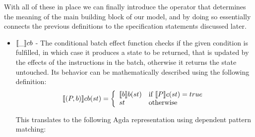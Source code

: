 With all of these in place we can finally introduce the operator that determines the meaning of the main building block of our model, and by doing so essentially connects the previous definitions to the specification statements discussed later.
\begin{itemize}
    \item $\llbracket \_ \rrbracket cb$ - The conditional batch effect function checks if the given condition is fulfilled, in which case it produces a state to be returned, that is updated by the effects of the instructions in the batch, otherwise it returns the state untouched. Its behavior can be mathematically described using the following definition:
    \begin{equation}
        \llbracket (P, b) \rrbracket cb(st) = 
        \left\{
        	\begin{array}{ll}
        		\llbracket b \rrbracket b(st) & \mbox{if } \llbracket P \rrbracket c(st) = true \\
        		st & \mbox{otherwise}
        	\end{array}
        \right.
    \end{equation}
    
    This translates to the following Agda representation using dependent pattern matching:
    \begin{code}
        \>[2]\AgdaSpace{}%
        \AgdaSymbol{:}\AgdaSpace{}%
        \AgdaSpace{}%
        \AgdaSpace{}%
        \AgdaSpace{}%
        \AgdaSpace{}%
        \<%
        \\
        \>[2]\AgdaSpace{}%
        \AgdaSymbol{(}\AgdaSpace{}%
        \AgdaOperator{\AgdaInductiveConstructor{,}}\AgdaSpace{}%
        \AgdaSymbol{)}\AgdaSpace{}%
        \AgdaSpace{}%
        \AgdaSpace{}%
        \AgdaSpace{}%
        \AgdaSpace{}%
        \AgdaSpace{}%
        \AgdaSpace{}%
        \<%
        \\
        \>[2]\AgdaSpace{}%
        \AgdaSymbol{|}\AgdaSpace{}%
        \AgdaSpace{}%
        \AgdaSymbol{=}\AgdaSpace{}%
        \AgdaSpace{}%
        \AgdaSpace{}%
        \AgdaSpace{}%
        \<%
        \\
        \>[2]\AgdaSpace{}%
        \AgdaSymbol{|}\AgdaSpace{}%
        \AgdaSpace{}%
        \AgdaSymbol{=}\AgdaSpace{}%
        \<%
    \end{code}
    

\end{itemize}
